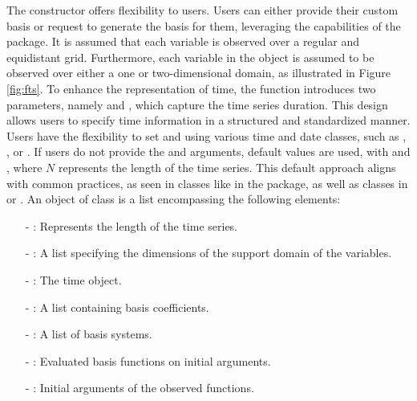 The  constructor offers flexibility to users. Users can either provide 
their custom basis or request  to generate the basis for them, leveraging 
the capabilities of the  package. It is assumed that each variable is 
observed over a regular and equidistant grid. Furthermore, each variable in the 
 object is assumed to be observed over either a one or two-dimensional 
domain, as illustrated in Figure \ref{fig:fts}. 
To enhance the representation of 
time, the  function introduces two parameters, namely  
and , which capture the time series duration. This design allows users to 
specify time information in a structured and standardized manner. Users have the 
flexibility to set 	 and  using various time and date 
classes, such as 	, , or . If users do not 
provide the  and  arguments, default values are used, with 
 and , where $N$ represents the length of the time 
series. This default approach aligns with common practices, as seen in classes 
like  in the  package, as well as  classes in 
 or .
An object of class  is a list encompassing the following elements:
	\begin{enumerate}
		\item[-] : Represents the length of the time series.
		\item[-] : A list specifying the dimensions of the support 
		domain of 
		the variables.
		\item[-] :  The time object.
		\item[-] :  A list containing basis coefficients.
		\item[-] :  A list of basis systems.
		\item[-] :  Evaluated basis functions on initial arguments.
		\item[-] :  Initial arguments of the observed functions.
	\end{enumerate}
